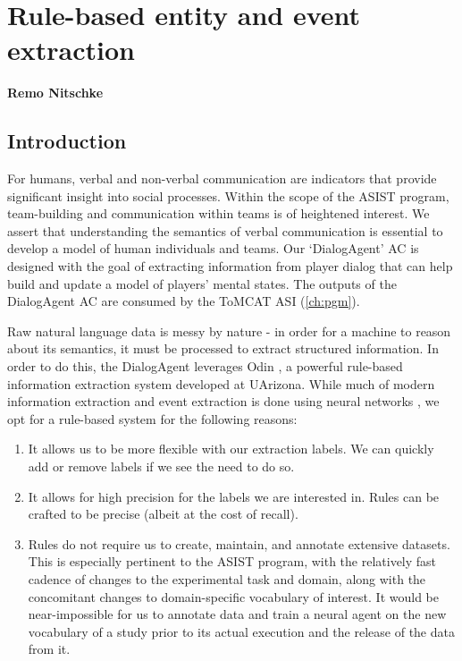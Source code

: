 \chapter{Rule-based entity and event extraction}
\label{ch:rule_based_ie}
\textbf{Remo Nitschke}

\section{Introduction}

For humans, verbal and non-verbal communication are indicators that provide
significant insight into social processes. Within the scope of the ASIST
program, team-building and communication within teams is of heightened
interest. We assert that understanding the semantics of verbal communication is
essential to develop a model of human individuals and teams. Our `DialogAgent'
AC is designed with the goal of extracting information from player dialog that
can help build and update a model of players' mental states. The outputs of the
DialogAgent AC are consumed by the ToMCAT ASI (\autoref{ch:pgm}).

Raw natural language data is messy by nature - in order for a machine to reason
about its semantics, it must be processed to extract structured information.
In order to do this, the DialogAgent leverages Odin
\cite{valenzuela-escarcega-etal-2016-odins}, a powerful rule-based information
extraction system developed at UArizona.  While much of modern information
extraction and event extraction is done using neural networks
\cite{Ahmad2021GATEGA, Du2020EventEB}, we opt for a rule-based system for the
following reasons:

\begin{enumerate}

 \item It allows us to be more flexible with our extraction labels. We can
     quickly add or remove labels if we see the need to do so.

 \item It allows for high precision for the labels we are interested in. Rules
     can be crafted to be precise (albeit at the cost of recall).

 \item Rules do not require us to create, maintain, and annotate extensive
     datasets. This is especially pertinent to the ASIST program, with the
     relatively fast cadence of changes to the experimental task and domain,
     along with the concomitant changes to domain-specific vocabulary of
     interest.  It would be near-impossible for us to annotate data and train a
     neural agent on the new vocabulary of a study prior to its actual
     execution and the release of the data from it. 

\end{enumerate}


